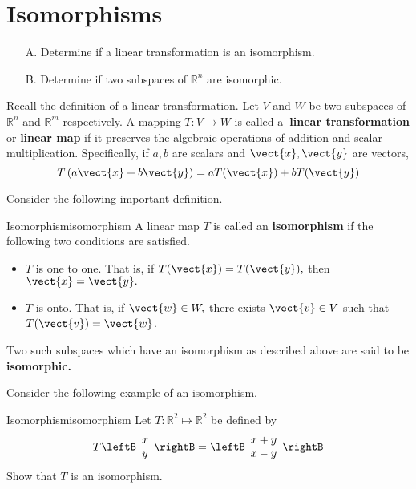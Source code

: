 \section{Isomorphisms}

\begin{outcome}
\begin{enumerate}
\item[A.]  Determine if a linear transformation is an isomorphism.

\item[B.]  Determine if two subspaces of $\mathbb{R}^n$ are isomorphic. 
\end{enumerate}
\end{outcome}

Recall the definition of a linear transformation. Let $V$ and $W$ be two subspaces of $\mathbb{R}^{n}$ and $\mathbb{R}^{m}$
respectively. A mapping $T:V\rightarrow W$ is called a\textbf{\ linear
transformation} or \textbf{linear map} if it preserves the algebraic
operations of addition and
 scalar multiplication. Specifically, if $a,b$
are scalars and $
\vect{x},\vect{y}$ are vectors, 
\begin{equation*}
T\left( a\vect{x}+b\vect{y}\right) =aT(\vect{x})+bT(\vect{y})
\end{equation*}

Consider the following important definition.

\begin{definition}{Isomorphism}{isomorphism}
A linear map $T$ is called an \textbf{isomorphism} 
if the following two conditions are satisfied.

\begin{itemize}
\item $T$ is one to one. That is, if $T(\vect{x})=T(\vect{y}),$ then $\vect{x}=\vect{y}.$

\item $T$ is onto. That is, if $\vect{w}\in W,$ there exists $
\vect{v}\in V$ such that $T(\vect{v})=\vect{w}$.
\end{itemize}

Two such subspaces which have an isomorphism as described above are said to
be \textbf{isomorphic.}
\end{definition}

Consider the following example of an isomorphism.

\begin{example}{Isomorphism}{isomorphism}
Let $T: \mathbb{R}^2 \mapsto \mathbb{R}^2$ be defined by 
\[
T \leftB \begin{array}{c}
x \\
y
\end{array} \rightB = \leftB \begin{array}{c}
x + y \\
x - y 
\end{array} \rightB
\]
Show that $T$ is an isomorphism.
\end{example}


